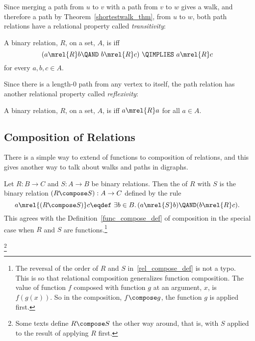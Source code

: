 Since merging a path from $u$ to $v$ with a path from $v$ to $w$ gives
a walk, and therefore a path by Theorem~\ref{shortestwalk_thm}, from
$u$ to $w$, both path relations have a relational property called
\emph{transitivity}:

\begin{definition}
A binary relation, $R$, on a set, $A$, is
 iff
\[
(a \mrel{R}  b \QAND\ b \mrel{R}  c)\ \QIMPLIES\  a \mrel{R}  c
\]
\quad for every $a,b,c\in A$.
\end{definition}

Since there is a length-0 path from any vertex to itself, the path
relation has another relational property called \emph{reflexivity}:

\begin{definition}
A binary relation, $R$, on a set, $A$, is  iff $a
\mrel{R} a$ for all $a \in A$.
\end{definition}

\subsection{Composition of Relations}\label{relation_compose_subsec}
There is a simple way to extend  of functions to
composition of relations, and this gives another way to talk about
walks and paths in digraphs.

\begin{definition}
Let $R: B\to C$ and $S: A \to B$ be binary relations.  Then the
 of $R$ with $S$ is the binary relation $(R \compose
S): A\to C$ defined by the rule
\begin{equation}\label{rel_compose_def}
a \mrel{(R \compose S)} c \eqdef\ \exists b \in B.\, (a \mrel{S} b)
\QAND (b \mrel{R} c).
\end{equation}
This agrees with the Definition~\ref{func_compose_def} of composition
in the special case when $R$ and $S$ are functions.\footnote{The
  reversal of the order of $R$ and $S$ in~\eqref{rel_compose_def} is
  not a typo.  This is so that relational composition generalizes
  function composition.  The value of function $f$ composed with
  function $g$ at an argument, $x$, is $f(g(x))$.  So in the
  composition, $f \compose g$, the function $g$ is applied first.}
\end{definition}

\begin{staffnotes}

\footnote{Some texts define $R \compose S$ the other way around, that
  is, with $S$ applied to the result of applying $R$ first.}

\end{staffnotes}

